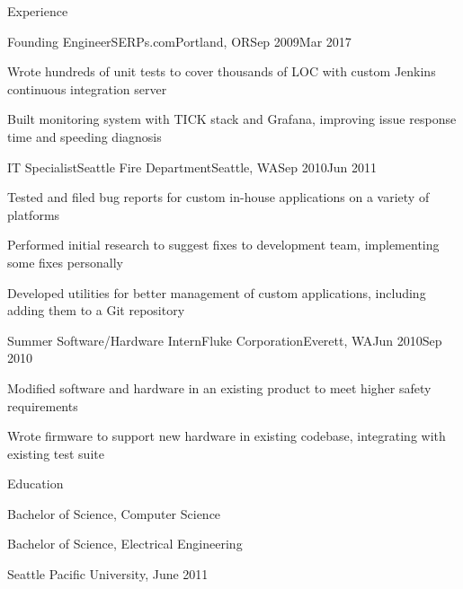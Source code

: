 \documentclass[letterpaper,12pt]{article}
\begin{document}
\begin{paracol}{2}
\begin{res_section}{Experience}
\begin{res_experienceitem}{Founding Engineer}{SERPs.com}{Portland, OR}{Sep 2009}{Mar 2017}
  \item Wrote hundreds of unit tests to cover thousands of LOC with custom Jenkins continuous integration server
  \item Built monitoring system with TICK stack and Grafana, improving issue response time and speeding diagnosis
\end{res_experienceitem}
\begin{res_experienceitem}{IT Specialist}{Seattle Fire Department}{Seattle, WA}{Sep 2010}{Jun 2011}
  \item Tested and filed bug reports for custom in-house applications on a variety of platforms
  \item Performed initial research to suggest fixes to development team, implementing some fixes personally
  \item Developed utilities for better management of custom applications, including adding them to a Git repository
\end{res_experienceitem}
\begin{res_experienceitem}{Summer Software/Hardware Intern}{Fluke Corporation}{Everett, WA}{Jun 2010}{Sep 2010}
  \item Modified software and hardware in an existing product to meet higher safety requirements
  \item Wrote firmware to support new hardware in existing codebase, integrating with existing test suite
\end{res_experienceitem}
\end{res_section}

\begin{res_section}{Education}
\begin{res_content}{Bachelor of Science, Computer Science

  \noindent Bachelor of Science, Electrical Engineering

  \textnormal{
      \sffamily
      \normalsize
      \hfill
      Seattle Pacific University, June 2011}
}
\end{res_content}
\end{res_section}


\end{paracol}
\end{document}
